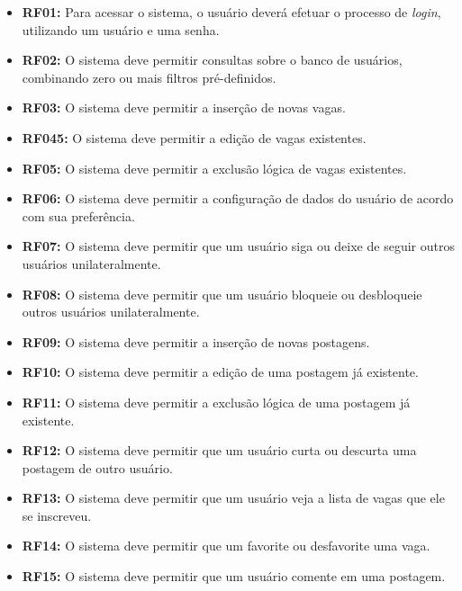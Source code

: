 \begin{itemize}
    \item \textbf{RF01:} Para acessar o sistema, o usuário deverá efetuar o processo de \textit{login}, utilizando um usuário e uma senha.
    
    \item \textbf{RF02:} O sistema deve permitir consultas sobre o banco de usuários, combinando zero ou mais filtros pré-definidos.
    
    \item \textbf{RF03:} O sistema deve permitir a inserção de novas vagas.
    
    \item \textbf{RF045:} O sistema deve permitir a edição de vagas existentes.
    
    \item \textbf{RF05:} O sistema deve permitir a exclusão lógica de vagas existentes.
    
    \item \textbf{RF06:} O sistema deve permitir a configuração de dados do usuário de acordo com sua preferência.
    
    \item \textbf{RF07:} O sistema deve permitir que um usuário siga ou deixe de seguir outros usuários unilateralmente.
    
    \item \textbf{RF08:} O sistema deve permitir que um usuário bloqueie ou desbloqueie outros usuários unilateralmente.
    
    \item \textbf{RF09:} O sistema deve permitir a inserção de novas postagens.
    
    \item \textbf{RF10:} O sistema deve permitir a edição de uma postagem já existente.
    
    \item \textbf{RF11:} O sistema deve permitir a exclusão lógica de uma postagem já existente.
    
    \item \textbf{RF12:} O sistema deve permitir que um usuário curta ou descurta uma postagem de outro usuário. 
    
    \item \textbf{RF13:} O sistema deve permitir que um usuário veja a lista de vagas que ele se inscreveu.
    
    \item \textbf{RF14:} O sistema deve permitir que um favorite ou desfavorite uma vaga.
    
     \item \textbf{RF15:} O sistema deve permitir que um usuário comente em uma postagem.
\end{itemize}

